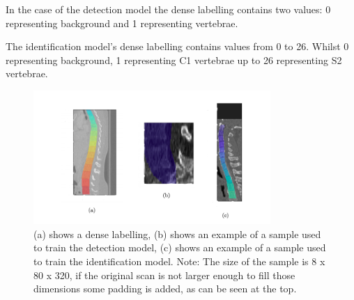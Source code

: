 In the case of the detection model the dense labelling contains two values: 0 representing background and 1 representing vertebrae. 

The identification model’s dense labelling contains values from 0 to 26. Whilst 0 representing background, 1 representing C1 vertebrae up to 26 representing S2 vertebrae.

\begin{figure}[h]
    \centering \includegraphics[width=9cm]{images/labeled_data.png}
    \caption {(a) shows a dense labelling, (b) shows an example of a sample used to train the detection model, (c) shows an example of a sample used to train the identification model. Note: The size of the sample is 8 x 80 x 320, if the original scan is not larger enough to fill those dimensions some padding is added, as can be seen at the top.}
    \label{fig:labeled_data}
\end{figure}
